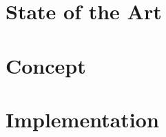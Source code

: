 \documentclass[twoside,a4paper,11pt,openright]{report}
\begin{document}



\cleardoublepage


\cleardoublepage


\cleardoublepage
\tableofcontents

\cleardoublepage


\cleardoublepage
{}

\chapter{State of the Art}
\label{chap:stateoftheart}



\chapter{Concept}
\label{chap:concept}


\chapter{Implementation}
\label{chap:implementation}


\end{document}
